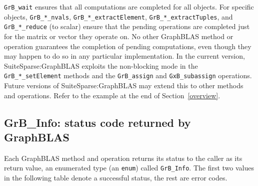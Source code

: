 \documentclass[12pt]{article}
\begin{document}
\verb'GrB_wait' ensures that all computations are completed for all objects.
For specific objects, \verb'GrB_*_nvals', \verb'GrB_*_extractElement',
\verb'GrB_*_extractTuples', and \verb'GrB_*_reduce' (to scalar) ensure that the
pending operations are completed just for the matrix or vector they operate on.
No other GraphBLAS method or operation guarantees the completion of pending
computations, even though they may happen to do so in any particular
implementation.  In the current version, SuiteSparse:GraphBLAS exploits the
non-blocking mode in the \verb'GrB_*_setElement' methods and the
\verb'GrB_assign' and \verb'GxB_subassign' operations.  Future versions of
SuiteSparse:GraphBLAS may extend this to other methods and operations.  Refer
to the example at the end of Section~\ref{overview}.

\newpage
\subsection{{\sf GrB\_Info:} status code returned by GraphBLAS} %
\label{info}

Each GraphBLAS method and operation returns its status to the caller as its
return value, an enumerated type (an \verb'enum') called \verb'GrB_Info'.  The
first two values in the following table denote a successful status, the rest
are error codes.
\end{document}
